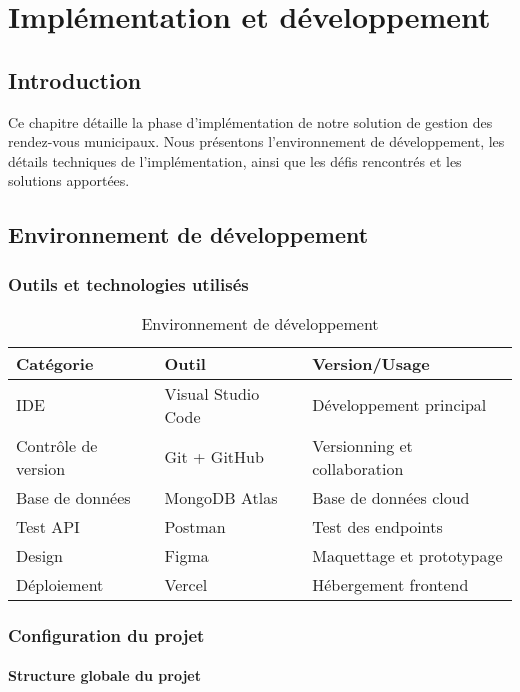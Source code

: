 \chapter{Implémentation et développement}

\section{Introduction}

Ce chapitre détaille la phase d'implémentation de notre solution de gestion des rendez-vous municipaux. Nous présentons l'environnement de développement, les détails techniques de l'implémentation, ainsi que les défis rencontrés et les solutions apportées.

\section{Environnement de développement}

\subsection{Outils et technologies utilisés}

\begin{table}[h]
\centering
\begin{tabular}{|l|l|p{5cm}|}
\hline
\textbf{Catégorie} & \textbf{Outil} & \textbf{Version/Usage} \\
\hline
IDE & Visual Studio Code & Développement principal \\
\hline
Contrôle de version & Git + GitHub & Versionning et collaboration \\
\hline
Base de données & MongoDB Atlas & Base de données cloud \\
\hline
Test API & Postman & Test des endpoints \\
\hline
Design & Figma & Maquettage et prototypage \\
\hline
Déploiement & Vercel & Hébergement frontend \\
\hline
\end{tabular}
\caption{Environnement de développement}
\label{tab:dev_environment}
\end{table}

\subsection{Configuration du projet}

\subsubsection{Structure globale du projet}

